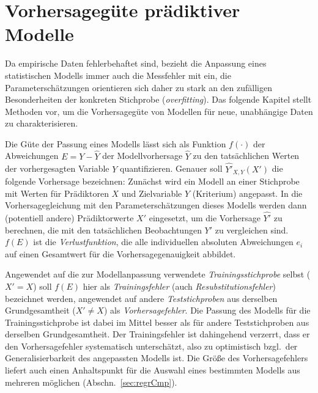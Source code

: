 \chapter{Vorhersagegüte prädiktiver Modelle}
\label{sec:prediction}

Da empirische Daten fehlerbehaftet sind, bezieht die Anpassung eines statistischen Modells immer auch die Messfehler mit ein, die Parameterschätzungen orientieren sich daher zu stark an den zufälligen Besonderheiten der konkreten Stichprobe (\emph{overfitting}). Das folgende Kapitel stellt Methoden vor, um die Vorhersagegüte von Modellen für neue, unabhängige Daten zu charakterisieren.

Die Güte der Passung eines Modells lässt sich als Funktion $f(\cdot)$ der Abweichungen $E = Y - \hat{Y}$ der Modellvorhersage $\hat{Y}$ zu den tatsächlichen Werten der vorhergesagten Variable $Y$ quantifizieren. Genauer soll $\hat{Y'}_{X, Y}(X')$ die folgende Vorhersage bezeichnen: Zunächst wird ein Modell an einer Stichprobe mit Werten für Prädiktoren $X$ und Zielvariable $Y$ (Kriterium) angepasst. In die Vorhersagegleichung mit den Parameterschätzungen dieses Modells werden dann (potentiell andere) Prädiktorwerte $X'$ eingesetzt, um die Vorhersage $\hat{Y'}$ zu berechnen, die mit den tatsächlichen Beobachtungen $Y'$ zu vergleichen sind. $f(E)$ ist die \emph{Verlustfunktion}, die alle individuellen absoluten Abweichungen $e_{i}$ auf einen Gesamtwert für die Vorhersagegenauigkeit abbildet.

Angewendet auf die zur Modellanpassung verwendete \emph{Trainingsstichprobe} selbst ($X' = X$) soll $f(E)$ hier als \emph{Trainingsfehler} (auch \emph{Resubstitutionsfehler}) bezeichnet werden, angewendet auf andere \emph{Teststichproben} aus derselben Grundgesamtheit ($X' \neq X$) als \emph{Vorhersagefehler}. Die Passung des Modells für die Trainingsstichprobe ist dabei im Mittel besser als für andere Teststichproben aus derselben Grundgesamtheit. Der Trainingsfehler ist dahingehend verzerrt, dass er den Vorhersagefehler systematisch unterschätzt, also zu optimistisch bzgl.\ der Generalisierbarkeit des angepassten Modells ist. Die Größe des Vorhersagefehlers liefert auch einen Anhaltspunkt für die Auswahl eines bestimmten Modells aus mehreren möglichen (Abschn.\ \ref{sec:regrCmp}).

